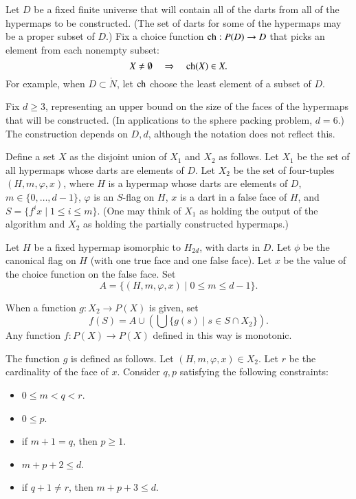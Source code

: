 Let $D$ be a fixed finite universe that will contain all of the darts from all of the hypermaps to be constructed.   (The set of darts for some of the hypermaps may be a proper subset of $D$.) 
Fix a choice function ${\operatorname{ch}}:P(D)\to D$ that picks an element from each nonempty subset:
$$
X\ne\emptyset\quad  \Rightarrow \quad  {\operatorname{ch}}(X)\in X.
$$
For example, when $D\subset\ring{N}$, let ${\operatorname{ch}}$ choose the least element of a subset of $D$.

Fix $d\ge 3$, representing an upper bound on the size of the faces of the hypermaps that will be constructed.  (In applications to the sphere packing problem, $d=6$.)
The construction depends on $D,d$, although the notation does not reflect this.

Define a set $X$ as the disjoint union of $X_1$ and $X_2$ as follows.  Let $X_1$ be the
set of all hypermaps whose darts are elements of $D$.  Let $X_2$ be the set of four-tuples
$(H,m,\varphi,x)$, where $H$ is a hypermap whose darts are elements of $D$, 
$m\in\{0,\ldots,d-1\}$, $\varphi$ is an $S$-flag on $H$, $x$ is a dart in a false face of $H$,
and $S = \{f^i x\mid 1 \le i \le m\}$.   (One may think of $X_1$ as holding the output of the algorithm and $X_2$ as holding the partially constructed hypermaps.)

Let $H$ be a fixed hypermap isomorphic to $H_{2d}$,
with darts in $D$.  Let $\phi$ be the canonical flag on $H$ (with one true face and one false face).
Let $x$ be the value of the choice function on the false face.  Set
$$A = \{(H,m,\varphi,x) \mid 0\le m \le d-1 \}.$$

When a function 
$g:X_2 \to P(X)$ is given, set 
$$f(S) = A \cup  (\bigcup  \{g(s) \mid s\in S\cap X_2\}).$$
Any function $f :P(X)\to P(X)$ defined in this way is monotonic.

The function $g$ is defined as follows.  Let $(H,m,\varphi,x)\in X_2$.  Let $r$ be the
cardinality of the face of $x$.  Consider $q,p$ satisfying the following constraints:
\begin{itemize}
\item $0\le m < q < r$.
\item $0\le p$.
\item if $m+1 = q$, then $p \ge 1$.
\item $m+p+2 \le d$.
\item if $q+1\ne r$, then $m+p+3\le d$.
\end{itemize}

